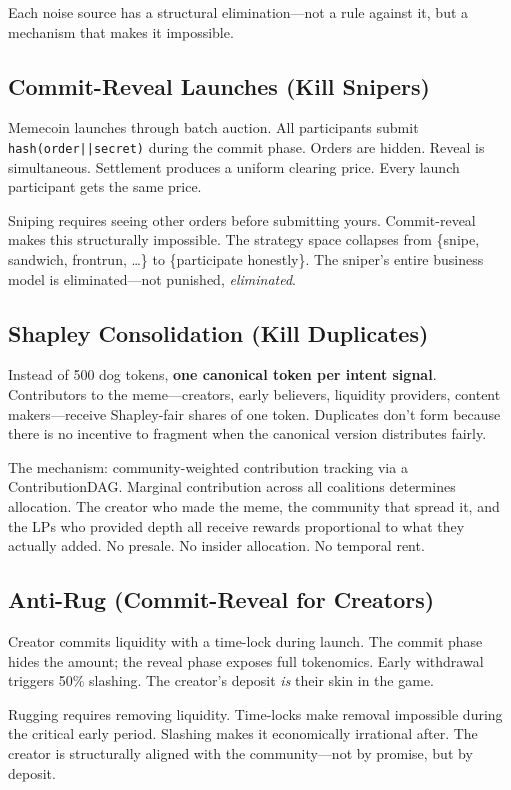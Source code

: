 \documentclass[9pt, letterpaper]{article}
\begin{document}
Each noise source has a structural elimination---not a rule against it, but a mechanism that makes it impossible.

\subsection{Commit-Reveal Launches (Kill Snipers)}

Memecoin launches through batch auction. All participants submit \texttt{hash(order||secret)} during the commit phase. Orders are hidden. Reveal is simultaneous. Settlement produces a uniform clearing price. Every launch participant gets the same price.

Sniping requires seeing other orders before submitting yours. Commit-reveal makes this structurally impossible. The strategy space collapses from \{snipe, sandwich, frontrun, \ldots\} to \{participate honestly\}. The sniper's entire business model is eliminated---not punished, \textit{eliminated}.

\subsection{Shapley Consolidation (Kill Duplicates)}

Instead of 500 dog tokens, \textbf{one canonical token per intent signal}. Contributors to the meme---creators, early believers, liquidity providers, content makers---receive Shapley-fair shares of one token. Duplicates don't form because there is no incentive to fragment when the canonical version distributes fairly.

The mechanism: community-weighted contribution tracking via a ContributionDAG. Marginal contribution across all coalitions determines allocation. The creator who made the meme, the community that spread it, and the LPs who provided depth all receive rewards proportional to what they actually added. No presale. No insider allocation. No temporal rent.

\subsection{Anti-Rug (Commit-Reveal for Creators)}

Creator commits liquidity with a time-lock during launch. The commit phase hides the amount; the reveal phase exposes full tokenomics. Early withdrawal triggers 50\% slashing. The creator's deposit \textit{is} their skin in the game.

Rugging requires removing liquidity. Time-locks make removal impossible during the critical early period. Slashing makes it economically irrational after. The creator is structurally aligned with the community---not by promise, but by deposit.
\end{document}
